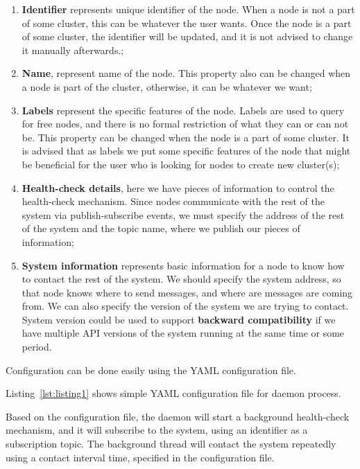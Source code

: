 \begin{enumerate}[start=1,label={(\bfseries \arabic*)}] \label{imp:features}
	\item \textbf{Identifier} represents unique identifier of the node. When a node is not a part of some cluster, this can be whatever the user wants. Once the node is a part of some cluster, the identifier will be updated, and it is not advised to change it manually afterwards.;
	\item \textbf{Name}, represent name of the node. This property also can be changed when a node is part of the cluster, otherwise, it can be whatever we want;
	\item \textbf{Labels} represent the specific features of the node. Labels are used to query for free nodes, and there is no formal restriction of what they can or can not be. This property can be changed when the node is a part of some cluster. It is advised that as labels we put some specific features of the node that might be beneficial for the user who is looking for nodes to create new cluster(s);
	\item \textbf{Health-check details}, here we have pieces of information to control the health-check mechanism. Since nodes communicate with the rest of the system via publish-subscribe events, we must specify the address of the rest of the system and the topic name, where we publish our pieces of information;
	\item \textbf{System information} represents basic information for a node to know how to contact the rest of the system. We should specify the system address, so that node knows where to send messages, and where are messages are coming from. We can also specify the version of the system we are trying to contact. System version could be used to support \textbf{backward compatibility} if we have multiple API versions of the system running at the same time or some period.
\end{enumerate} 

\noindent
Configuration can be done easily using the YAML configuration file. 

Listing~\ref{lst:listing1} shows simple YAML configuration file for daemon process.



\noindent
Based on the configuration file, the daemon will start a background health-check mechanism, and it will subscribe to the system, using an identifier as a subscription topic. The background thread will contact the system repeatedly using a contact interval time, specified in the configuration file. 

